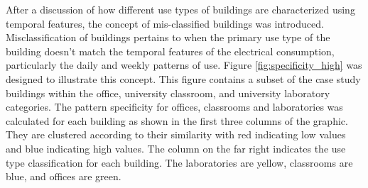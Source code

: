 After a discussion of how different use types of buildings are characterized using temporal features, the concept of mis-classified buildings was introduced. Misclassification of buildings pertains to when the primary use type of the building doesn't match the temporal features of the electrical consumption, particularly the daily and weekly patterns of use. Figure \ref{fig:specificity_high} was designed to illustrate this concept. This figure contains a subset of the case study buildings within the office, university classroom, and university laboratory categories. The pattern specificity for offices, classrooms and laboratories was calculated for each building as shown in the first three columns of the graphic. They are clustered according to their similarity with red indicating low values and blue indicating high values. The column on the far right indicates the use type classification for each building. The laboratories are yellow, classrooms are blue, and offices are green. 
